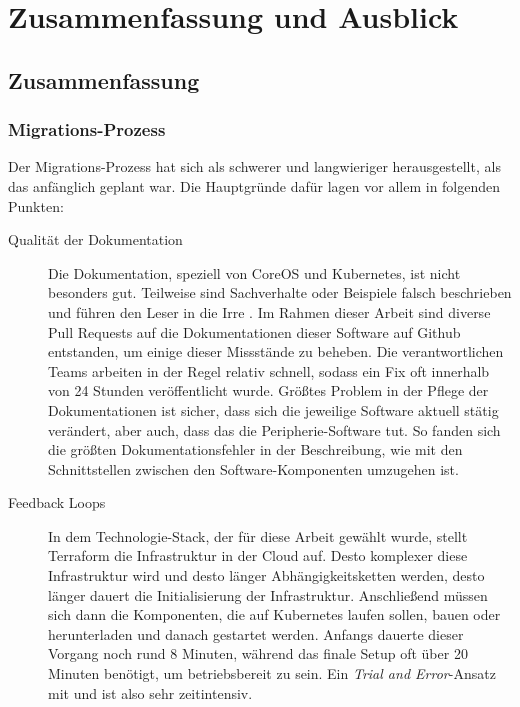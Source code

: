 \chapter{Zusammenfassung und Ausblick}
\label{cha:Zusammenfassung und Ausblick}

\section{Zusammenfassung}

\subsection{Migrations-Prozess}
Der Migrations-Prozess hat sich als schwerer und langwieriger herausgestellt,
als das anfänglich geplant war.
Die Hauptgründe dafür lagen vor allem
in folgenden Punkten:

\begin{description}
  \item[Qualität der Dokumentation]
  Die Dokumentation, speziell von CoreOS und Kubernetes, ist nicht besonders
  gut.
  Teilweise sind Sachverhalte oder
  Beispiele falsch beschrieben
  und führen den Leser in die Irre \cite{masteroslo}. Im Rahmen dieser Arbeit sind diverse
  Pull Requests auf die Dokumentationen dieser Software auf Github entstanden, um einige
  dieser Missstände zu beheben.
  Die verantwortlichen Teams arbeiten in der Regel relativ
  schnell, sodass ein Fix oft
  innerhalb von 24 Stunden veröffentlicht wurde.
  Größtes Problem in der Pflege der Dokumentationen ist sicher, dass sich
  die jeweilige Software aktuell stätig verändert, aber auch, dass das die
  Peripherie-Software tut. So fanden sich die größten Dokumentationsfehler
  in der Beschreibung, wie mit den Schnittstellen zwischen den
  Software-Komponenten
  umzugehen ist.
  \item[Feedback Loops]
  In dem Technologie-Stack, der für diese Arbeit gewählt wurde, stellt
  Terraform die Infrastruktur in der Cloud auf. Desto komplexer diese
  Infrastruktur wird und desto länger Abhängigkeitsketten werden, desto
  länger dauert die Initialisierung der Infrastruktur.
  Anschließend m\"ussen sich dann die Komponenten, die auf Kubernetes laufen
  sollen,
  bauen oder herunterladen und danach gestartet werden.
  Anfangs dauerte dieser Vorgang
  noch rund 8 Minuten, während das finale Setup oft über 20 Minuten
  benötigt, um
  betriebsbereit zu sein. Ein \emph{Trial and Error}-Ansatz mit
   und  ist also sehr
  zeitintensiv.
\end{description}

